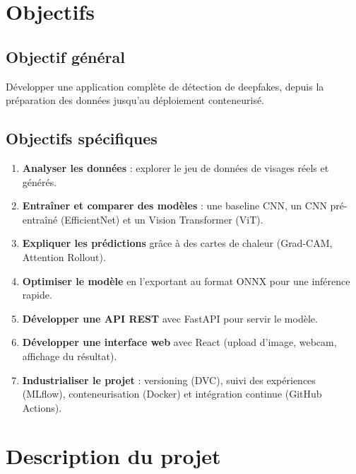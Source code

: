 \documentclass[11pt,a4paper]{article}
\begin{document}
\section{Objectifs}

\subsection{Objectif général}
Développer une application complète de détection de deepfakes, depuis la préparation des données
jusqu'au déploiement conteneurisé.

\subsection{Objectifs spécifiques}
\begin{enumerate}
  \item \textbf{Analyser les données} : explorer le jeu de données de visages réels et générés.
  \item \textbf{Entraîner et comparer des modèles} : une baseline CNN, un CNN pré-entraîné
        (EfficientNet) et un Vision Transformer (ViT).
  \item \textbf{Expliquer les prédictions} grâce à des cartes de chaleur (Grad-CAM, Attention Rollout).
  \item \textbf{Optimiser le modèle} en l'exportant au format ONNX pour une inférence rapide.
  \item \textbf{Développer une API REST} avec FastAPI pour servir le modèle.
  \item \textbf{Développer une interface web} avec React (upload d'image, webcam, affichage du résultat).
  \item \textbf{Industrialiser le projet} : versioning (DVC), suivi des expériences (MLflow),
        conteneurisation (Docker) et intégration continue (GitHub Actions).
\end{enumerate}

\section{Description du projet}
\end{document}
